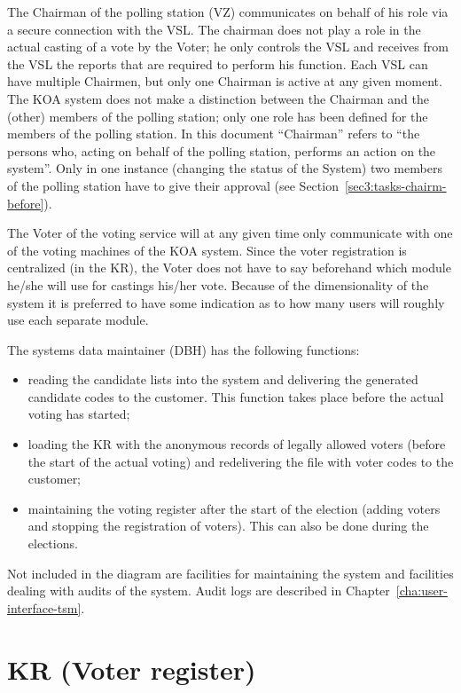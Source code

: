 The Chairman of the polling station (VZ) communicates on behalf of his
role via a secure connection with the VSL. The chairman does not play
a role in the actual casting of a vote by the Voter; he only controls
the VSL and receives from the VSL the reports that are required to
perform his function. Each VSL can have multiple Chairmen, but only
one Chairman is active at any given moment. The KOA system does not
make a distinction between the Chairman and the (other) members of the
polling station; only one role has been defined for the members of the
polling station. In this document ``Chairman'' refers to ``the persons
who, acting on behalf of the polling station, performs an action on
the system''. Only in one instance (changing the status of the System)
two members of the polling station have to give their approval (see
Section~\ref{sec3:tasks-chairm-before}).

The Voter of the voting service will at any given time only
communicate with one of the voting machines of the KOA system. Since
the voter registration is centralized (in the KR), the Voter does not
have to say beforehand which module he/she will use for castings
his/her vote. Because of the dimensionality of the system it is
preferred to have some indication as to how many users will roughly
use each separate module.

The systems data maintainer (DBH) has the following functions:
\begin{itemize}
	\item reading the candidate lists into the system and
	delivering the generated candidate codes to the customer. This
	function takes place before the actual voting has started;

	\item loading the KR with the anonymous records of legally
	allowed voters (before the start of the actual voting) and
	redelivering the file with voter codes to the customer;

	\item maintaining the voting register after the start of the
	election (adding voters and stopping the registration of
	voters). This can also be done during the elections.

\end{itemize}

Not included in the diagram are facilities for maintaining the system
and facilities dealing with audits of the system. Audit logs are
described in Chapter~\ref{cha:user-interface-tsm}.

\section{KR (Voter register)}\label{sec2:kr-choser-register}

